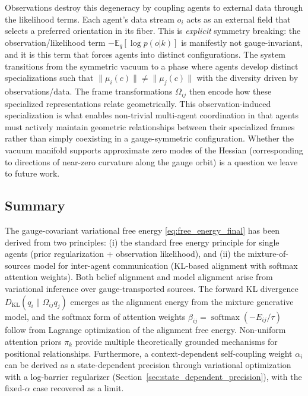 \documentclass[twoside,11pt]{article}
\begin{document}
Observations destroy this degeneracy by coupling agents to external data through the likelihood terms. Each agent's data stream $o_i$ acts as an external field that selects a preferred orientation in its fiber. This is \emph{explicit} symmetry breaking: the observation/likelihood term $-\mathbb{E}_q[\log p(o|k)]$ is manifestly not gauge-invariant, and it is this term that forces agents into distinct configurations. The system transitions from the symmetric vacuum to a phase where agents develop distinct specializations such that $\|\mu_i(c)\| \neq \|\mu_j(c)\|$ with the diversity driven by observations/data. The frame transformations $\Omega_{ij}$ then encode how these specialized representations relate geometrically. This observation-induced specialization is what enables non-trivial multi-agent coordination in that agents must actively maintain geometric relationships between their specialized frames rather than simply coexisting in a gauge-symmetric configuration. Whether the vacuum manifold supports approximate zero modes of the Hessian (corresponding to directions of near-zero curvature along the gauge orbit) is a question we leave to future work.

\subsection{Summary}

The gauge-covariant variational free energy \eqref{eq:free_energy_final} has been derived from two principles: (i) the standard free energy principle for single agents (prior regularization + observation likelihood), and (ii) the mixture-of-sources model for inter-agent communication (KL-based alignment with softmax attention weights). Both belief alignment and model alignment arise from variational inference over gauge-transported sources. The forward KL divergence $D_{\mathrm{KL}}(q_i \| \Omega_{ij}q_j)$ emerges as the alignment energy from the mixture generative model, and the softmax form of attention weights $\beta_{ij} = \operatorname{softmax}(-E_{ij}/\tau)$ follow from Lagrange optimization of the alignment free energy. Non-uniform attention priors $\pi_k$ provide multiple theoretically grounded mechanisms for positional relationships. Furthermore, a context-dependent self-coupling weight $\alpha_i$ can be derived as a state-dependent precision through variational optimization with a log-barrier regularizer (Section~\ref{sec:state_dependent_precision}), with the fixed-$\alpha$ case recovered as a limit.
\end{document}
